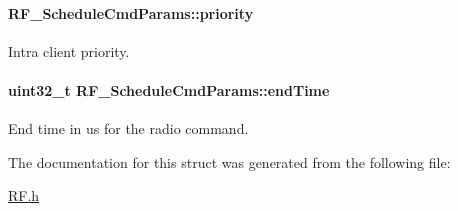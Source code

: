 \paragraph[{priority}]{ R\+F\+\_\+\+Schedule\+Cmd\+Params\+::priority}\label{struct_r_f___schedule_cmd_params_a809078fc59bdf91f81ef390da0047537}


Intra client priority. 

\paragraph[{end\+Time}]{\setlength{\rightskip}{0pt plus 5cm}uint32\+\_\+t R\+F\+\_\+\+Schedule\+Cmd\+Params\+::end\+Time}\label{struct_r_f___schedule_cmd_params_ae4244a807352c8c93def2d39bbbd080e}


End time in us for the radio command. 



The documentation for this struct was generated from the following file\+:\begin{DoxyCompactItemize}
\item 
\hyperlink{_r_f_8h}{R\+F.\+h}\end{DoxyCompactItemize}
